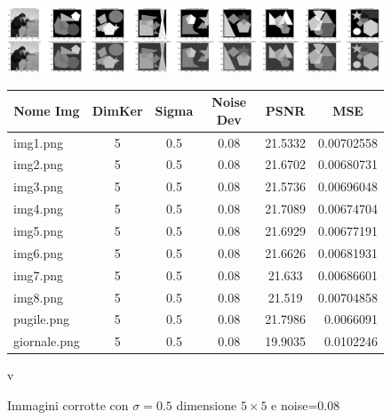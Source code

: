 \begin{figure}[H]
    \centering
    \begin{minipage}[h]{\textwidth}
    \includegraphics[width=\linewidth]{output/tabCorrotte/imgcorr3.png}\label{fig:imgcorrotte3}
    \end{minipage}
    \begin{minipage}[h]{\textwidth}
        \centering
        
        \begin{tabular}{|l c c c c r|}
            \hline
            \multicolumn{1}{|c}{\textbf{Nome Img}} & \multicolumn{1}{|c}{\textbf{DimKer}} & \multicolumn{1}{|c}{\textbf{Sigma}} & \multicolumn{1}{|c}{\textbf{Noise Dev}} & \multicolumn{1}{|c}{\textbf{PSNR}} & \multicolumn{1}{|c|}{\textbf{MSE}} \\ \hline
                img1.png & 5 & 0.5 & 0.08 & 21.5332 & 0.00702558 \\
                img2.png & 5 & 0.5 & 0.08 & 21.6702 & 0.00680731 \\
                img3.png & 5 & 0.5 & 0.08 & 21.5736 & 0.00696048 \\
                img4.png & 5 & 0.5 & 0.08 & 21.7089 & 0.00674704 \\
                img5.png & 5 & 0.5 & 0.08 & 21.6929 & 0.00677191 \\
                img6.png & 5 & 0.5 & 0.08 & 21.6626 & 0.00681931 \\
                img7.png & 5 & 0.5 & 0.08 & 21.633 & 0.00686601 \\
                img8.png & 5 & 0.5 & 0.08 & 21.519 & 0.00704858 \\
                pugile.png & 5 & 0.5 & 0.08 & 21.7986 & 0.0066091\\
                giornale.png & 5 & 0.5 & 0.08 & 19.9035 & 0.0102246 \\ \hline
            \end{tabular}v\label{tab:tabcorrotte3}
        
        \end{minipage}
    \captionsetup{labelformat=andtable}
    \caption{Immagini corrotte con $\sigma = 0.5$ dimensione $5 \times 5$ e noise=0.08}
\end{figure}


